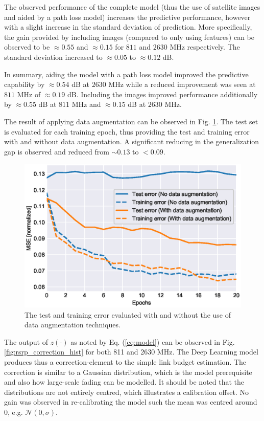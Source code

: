 The observed performance of the complete model (thus the use of satellite images and aided by a path loss model) increases the predictive performance, however with a slight increase in the standard deviation of prediction. More specifically, the gain provided by including images (compared to only using features) can be observed to be $\approx 0.55$ and $\approx 0.15$ for $811$ and $2630$ MHz respectively. The standard deviation increased to $\approx 0.05$ to $\approx 0.12$ dB. 

In summary, aiding the model with a path loss model improved the predictive capability by $\approx 0.54$ dB at $2630$ MHz while a reduced improvement was seen at $811$ MHz of $\approx 0.19$ dB. Including the images improved performance additionally by $\approx 0.55$ dB at $811$ MHz and $\approx 0.15$ dB at $2630$ MHz.


The result of applying data augmentation can be observed in Fig. \ref{fig:dataaugmentation_training_test_error}. The test set is evaluated for each training epoch, thus providing the test and training error with and without data augmentation. A significant reducing in the generalization gap is observed and reduced from $\sim 0.13$ to $< 0.09$. 

\begin{figure}
    \centering
    \includegraphics{chapters/part_pathloss/model_aided_paper/dataaugmentation_training_test_error.eps}
    \caption{The test and training error evaluated with and without the use of data augmentation techniques.}
    \label{fig:dataaugmentation_training_test_error}
\end{figure}

The output of $z(\cdot)$ as noted by Eq. (\ref{eq:model}) can be observed in Fig. \ref{fig:rsrp_correction_hist} for both 811 and 2630 MHz. The Deep Learning model produces thus a correction-element to the simple link budget estimation. The correction is similar to a Gaussian distribution, which is the model prerequisite and also how large-scale fading can be modelled. It should be noted that the distributions are not entirely centred, which illustrates a calibration offset. No gain was observed in re-calibrating the model such the mean was centred around $0$, e.g. $\mathcal{N}(0, \sigma)$.

